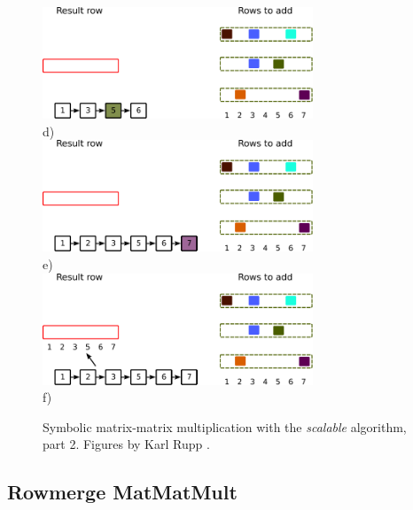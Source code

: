 \begin{figure}[H]
\centering
\includegraphics[width=0.72\textwidth]{scalable/spgemm-scalable-6}\\
d)\\
\vspace*{15mm}
\includegraphics[width=0.72\textwidth]{scalable/spgemm-scalable-8}\\
e)\\
\vspace*{15mm}
\includegraphics[width=0.72\textwidth]{scalable/spgemm-scalable-10}\\
f)\\
\vspace*{10mm}
\caption{Symbolic matrix-matrix multiplication with the \textit{scalable} algorithm, part 2. Figures by Karl Rupp \cite{karli_LANS_image}.}
\label{fig:spgemm-scalable_2}
\end{figure}



\subsection{Rowmerge MatMatMult}

